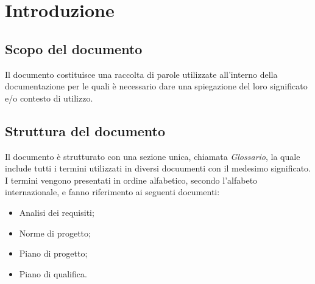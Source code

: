 \section{Introduzione}

\subsection{Scopo del documento}
Il documento costituisce una raccolta di parole utilizzate all'interno della documentazione per le quali è necessario dare una spiegazione del loro significato e/o contesto di utilizzo.

\subsection{Struttura del documento}
Il documento è strutturato con una sezione unica, chiamata \textit{Glossario}, la quale include tutti i termini utilizzati in diversi docuumenti con il medesimo significato. I termini vengono presentati in ordine alfabetico, secondo l'alfabeto internazionale, e fanno riferimento ai seguenti documenti:
\begin{itemize}
	\item Analisi dei requisiti;
	\item Norme di progetto;
	\item Piano di progetto;
	\item Piano di qualifica.
\end{itemize}
